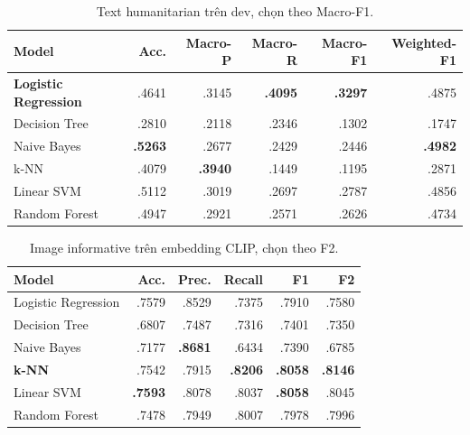 \begin{table}[H]\centering\scriptsize
\caption{Text humanitarian trên dev, chọn theo Macro-F1.}
\begin{tabular}{lrrrrr}
\toprule
\textbf{Model} & \textbf{Acc.} & \textbf{Macro-P} & \textbf{Macro-R} &
\textbf{Macro-F1} & \textbf{Weighted-F1}\\
\midrule
\textbf{Logistic Regression} & .4641 & .3145 & \textbf{.4095} & \textbf{.3297} & .4875\\
Decision Tree & .2810 & .2118 & .2346 & .1302 & .1747\\
Naive Bayes & \textbf{.5263} & .2677 & .2429 & .2446 & \textbf{.4982}\\
k-NN & .4079 & \textbf{.3940} & .1449 & .1195 & .2871\\
Linear SVM & .5112 & .3019 & .2697 & .2787 & .4856\\
Random Forest & .4947 & .2921 & .2571 & .2626 & .4734\\
\bottomrule
\end{tabular}
\end{table}

\begin{table}[H]\centering\scriptsize
\caption{Image informative trên embedding CLIP, chọn theo F2.}
\begin{tabular}{lrrrrr}
\toprule
\textbf{Model} & \textbf{Acc.} & \textbf{Prec.} & \textbf{Recall} & \textbf{F1} & \textbf{F2}\\
\midrule
Logistic Regression & .7579 & .8529 & .7375 & .7910 & .7580\\
Decision Tree & .6807 & .7487 & .7316 & .7401 & .7350\\
Naive Bayes & .7177 & \textbf{.8681} & .6434 & .7390 & .6785\\
\textbf{k-NN} & .7542 & .7915 & \textbf{.8206} & \textbf{.8058} & \textbf{.8146}\\
Linear SVM & \textbf{.7593} & .8078 & .8037 & \textbf{.8058} & .8045\\
Random Forest & .7478 & .7949 & .8007 & .7978 & .7996\\
\bottomrule
\end{tabular}
\end{table}

